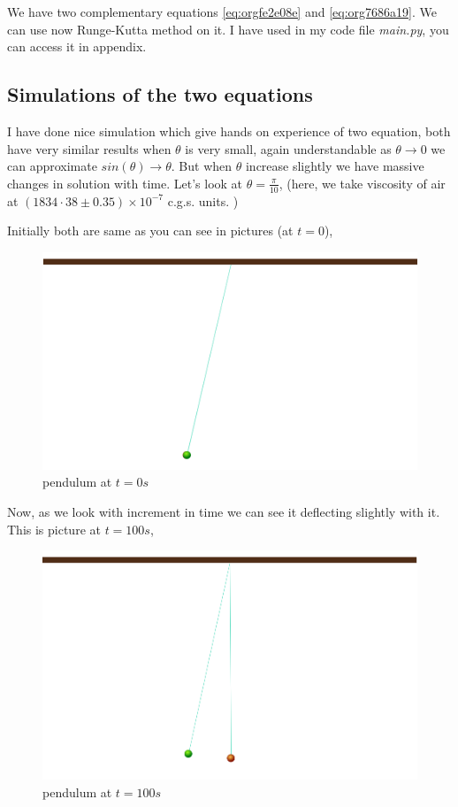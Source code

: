 \documentclass[11pt,a4paper]{article}
\begin{document}
We have two complementary equations \ref{eq:orgfe2e08e} and \ref{eq:org7686a19}. We can use now Runge-Kutta method on it. I have used in my code file \emph{main.py}, you can access it in appendix. 

\subsection{Simulations of the two equations}
\label{sec:orgb40cda1}

I have done nice simulation which give hands on experience of two equation, both have very similar results when \(\theta\) is very small, again understandable as \(\theta \to 0\) we can approximate \(sin(\theta) \to \theta\). But when \(\theta\) increase slightly we have massive changes in solution with time. Let's look at \(\theta = \frac{\pi}{10}\), (here, we take viscosity of air at \((1834·38\pm0.35)\times10^{−7}\) c.g.s. units. \cite{majumdar1938coefficient})

Initially both are same as you can see in pictures (at \(t=0\)),
\begin{figure}[htbp]
\centering
\includegraphics[width=0.8 \textwidth]{t0.png}
\caption{\label{fig:org9b9494c}pendulum at \(t=0s\)}
\end{figure}

Now, as we look with increment in time we can see it deflecting slightly with it. This is picture at \(t = 100s\),
\begin{figure}[htbp]
\centering
\includegraphics[width=0.8 \textwidth]{t100.png}
\caption{\label{fig:org80443eb}pendulum at \(t=100s\)}
\end{figure}
\end{document}
